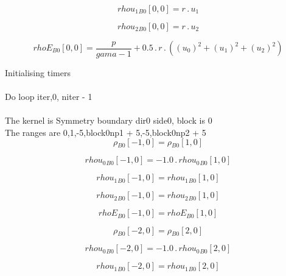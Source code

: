 \documentclass{article}
\begin{document}
\begin{dmath}{rhou_{1}{_{B0}}}[{0,0}] = r \,.\, u_{1}\end{dmath}

\begin{dmath}{rhou_{2}{_{B0}}}[{0,0}] = r \,.\, u_{2}\end{dmath}

\begin{dmath}{rhoE{_{B0}}}[{0,0}] = \frac{p}{gama - 1} + 0.5 \,.\, r \,.\, \left(\left(u_{0} \right)^{2} + \left(u_{1} \right)^{2} + \left(u_{2} \right)^{2}\right)\end{dmath}

\noindent Initialising timers\\
\\\noindent Do loop iter,0, niter - 1\\
\\\noindent The kernel is Symmetry boundary dir0 side0, block is 0\\\noindent The ranges are 0,1,-5,block0np1 + 5,-5,block0np2 + 5\\\begin{dmath}{\rho{_{B0}}}[{-1,0}] = {\rho{_{B0}}}[{1,0}]\end{dmath}

\begin{dmath}{rhou_{0}{_{B0}}}[{-1,0}] = - 1.0 \,.\, {rhou_{0}{_{B0}}}[{1,0}]\end{dmath}

\begin{dmath}{rhou_{1}{_{B0}}}[{-1,0}] = {rhou_{1}{_{B0}}}[{1,0}]\end{dmath}

\begin{dmath}{rhou_{2}{_{B0}}}[{-1,0}] = {rhou_{2}{_{B0}}}[{1,0}]\end{dmath}

\begin{dmath}{rhoE{_{B0}}}[{-1,0}] = {rhoE{_{B0}}}[{1,0}]\end{dmath}

\begin{dmath}{\rho{_{B0}}}[{-2,0}] = {\rho{_{B0}}}[{2,0}]\end{dmath}

\begin{dmath}{rhou_{0}{_{B0}}}[{-2,0}] = - 1.0 \,.\, {rhou_{0}{_{B0}}}[{2,0}]\end{dmath}

\begin{dmath}{rhou_{1}{_{B0}}}[{-2,0}] = {rhou_{1}{_{B0}}}[{2,0}]\end{dmath}
\end{document}
